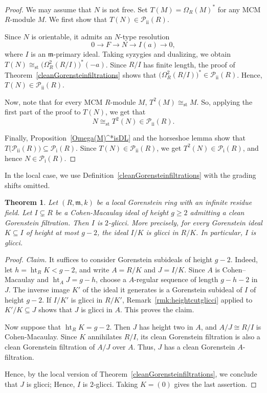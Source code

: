 \documentclass[11pt,letterpaper]{amsart}
\theoremstyle{plain}
\newtheorem{thm}{Theorem}[section]
\theoremstyle{definition}
\theoremstyle{remark}
\begin{document}
\begin{proof}
We may assume that $N$ is not free. Set
$T(M)=\Omega_R(M)^*$ for any MCM $R$-module $M$.
We first show that $T(N)\in\mathcal P_{\mathrm{ii}}(R)$. 

Since $N$ is orientable, it admits an $N$-type resolution
\[
0\longrightarrow F\longrightarrow N
\longrightarrow I(a)\longrightarrow0,
\]
where $I$ is an $\mathfrak m$-primary ideal. Taking syzygies and dualizing, we obtain $
T(N)\cong_{\mathrm{st}}
\bigl(\Omega_R^2(R/I)\bigr)^*(-a)$. Since $R/I$ has finite length, the proof of
Theorem~\ref{cleanGorensteinfiltrations} shows that $\bigl(\Omega_R^2(R/I)\bigr)^*
\in\mathcal P_{\mathrm{ii}}(R)$.
Hence, $T(N)\in\mathcal P_{\mathrm{ii}}(R)$.

Now, note that for every MCM $R$-module $M$, $T^2(M)\cong_{\mathrm{st}}M$. 
So, applying the first part of the proof
to $T(N)$, we get that
\[
N\cong_{\mathrm{st}}T^2(N)\in\mathcal P_{\mathrm{ii}}(R).
\]

Finally, Proposition~\ref{Omega(M)^*isDL} and the horseshoe lemma
show that $T\bigl(\mathcal P_{\mathrm{ii}}(R)\bigr)
\subseteq\mathcal P_{\mathrm{i}}(R)$. 
Since $T(N)\in\mathcal P_{\mathrm{ii}}(R)$, we get
$T^2(N)\in\mathcal P_{\mathrm{i}}(R)$, and hence
$N\in\mathcal P_{\mathrm{i}}(R)$.
\end{proof}

In the local case, we use Definition~\ref{cleanGorensteinfiltrations} with the grading shifts omitted.

\begin{thm}\label{thm:clean-gorenstein-local}
Let $(R,\mathfrak m,k)$ be a local Gorenstein ring with an infinite residue
field. Let $I\subsetneq R$ be a Cohen-Macaulay ideal of height $g\geq 2$
admitting a clean Gorenstein filtration. Then $I$ is $2$-glicci. More
precisely, for every Gorenstein ideal $K\subseteq I$ of height at most
$g-2$, the ideal $I/K$ is glicci in $R/K$. In particular, $I$ is glicci.
\end{thm}

\begin{proof}
\emph{Claim.} It suffices to consider Gorenstein subideals of height $g-2$.
Indeed, let $h=\operatorname{ht}_R K<g-2$, and write $A=R/K$ and $J=I/K$.
Since $A$ is Cohen--Macaulay and $\operatorname{ht}_A J=g-h$, choose a
$A$-regular sequence of length $g-h-2$ in $J$. The inverse image $K'$
of the ideal it generates is a Gorenstein subideal of $I$ of height $g-2$.
If $I/K'$ is glicci in $R/K'$, Remark~\ref{rmk:heightcutglicci} applied to $K'/K\subseteq J$
shows that $J$ is glicci in $A$. This proves the claim.

Now suppose that $\operatorname{ht}_R K=g-2$. Then $J$ has height two
in $A$, and $A/J\cong R/I$ is Cohen-Macaulay. Since $K$ annihilates
$R/I$, its clean Gorenstein filtration is also a clean Gorenstein filtration of $A/J$ over $A$. Thus, $J$ has a clean
Gorenstein $A$-filtration. 

Hence, by the local version of Theorem~\ref{cleanGorensteinfiltrations}, we conclude that $J$ is glicci; Hence, $I$ is $2$-glicci.
Taking $K=(0)$ gives the last assertion.
\end{proof}
\end{document}
